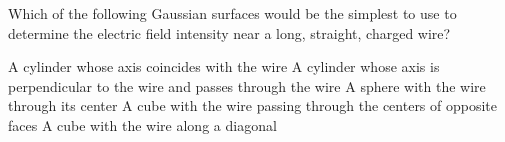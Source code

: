 \begin{questions}\setcounter{question}{0}\question
Which of the following Gaussian surfaces would be the simplest to use to determine the electric field intensity near a long, straight, charged wire?

\begin{choices}
\choice A cylinder whose axis coincides with the wire
\choice A cylinder whose axis is perpendicular to the wire and passes through the wire
\choice A sphere with the wire through its center
\choice A cube with the wire passing through the centers of opposite faces
\choice A cube with the wire along a diagonal
\end{choices}\end{questions}

